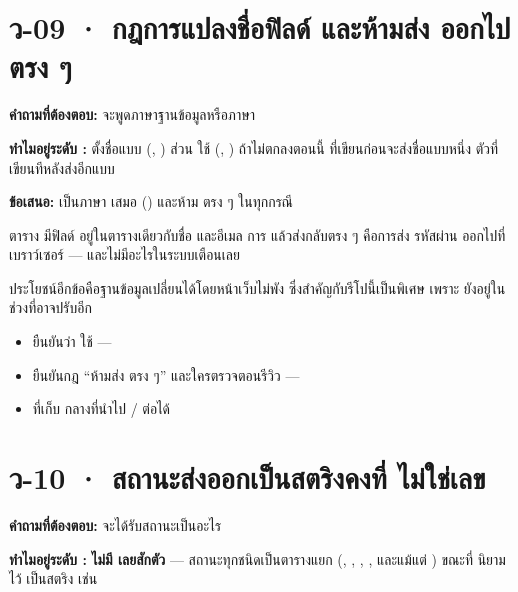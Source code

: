 \section{ว-09 · กฎการแปลงชื่อฟิลด์ และห้ามส่ง  ออกไปตรง ๆ}

\textbf{คำถามที่ต้องตอบ:}  จะพูดภาษาฐานข้อมูลหรือภาษา 

\textbf{ทำไมอยู่ระดับ \pone{}:}  ตั้งชื่อแบบ
 (, ) ส่วน
 ใช้  (,
) ถ้าไม่ตกลงตอนนี้  ที่เขียนก่อนจะส่งชื่อแบบหนึ่ง
ตัวที่เขียนทีหลังส่งอีกแบบ

\textbf{ข้อเสนอ:}  เป็นภาษา  เสมอ ()
และห้าม   ตรง ๆ ในทุกกรณี

\begin{badbox}[title={เหตุผลที่ห้ามไม่ใช่แค่เรื่องความสวยงามของชื่อ}]
ตาราง  มีฟิลด์  อยู่ในตารางเดียวกับชื่อ
และอีเมล การ  แล้วส่งกลับตรง ๆ คือการส่ง  รหัสผ่าน
ออกไปที่เบราว์เซอร์ --- และไม่มีอะไรในระบบเตือนเลย

ประโยชน์อีกข้อคือฐานข้อมูลเปลี่ยนได้โดยหน้าเว็บไม่พัง ซึ่งสำคัญกับรีโปนี้เป็นพิเศษ
เพราะ  ยังอยู่ในช่วงที่อาจปรับอีก
\end{badbox}

\begin{outbox}
\begin{itemize}
\item ยืนยันว่า  ใช้  ---
\item ยืนยันกฎ ``ห้ามส่ง  ตรง ๆ'' และใครตรวจตอนรีวิว ---
\item ที่เก็บ  กลางที่นำไป / ต่อได้
\end{itemize}
\end{outbox}

\section{ว-10 · สถานะส่งออกเป็นสตริงคงที่ ไม่ใช่เลข }

\textbf{คำถามที่ต้องตอบ:}  จะได้รับสถานะเป็นอะไร

\textbf{ทำไมอยู่ระดับ \pone{}:}  \textbf{ไม่มี 
เลยสักตัว} --- สถานะทุกชนิดเป็นตารางแยก (,
, , ,
 และแม้แต่ ) ขณะที่  นิยามไว้
เป็นสตริง เช่น 

